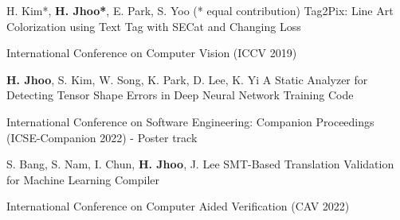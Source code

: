 

\begin{cventries}

  \cvpub
  {H. Kim*, \textbf{H. Jhoo*}, E. Park, S. Yoo (* equal contribution)} %
  {Tag2Pix: Line Art Colorization using Text Tag with SECat and Changing Loss} %
  {} %
  {} %
  {
    \begin{cvitems} %
      \item International Conference on Computer Vision (ICCV 2019)
    \end{cvitems}
  }

  \cvpub
  {\textbf{H. Jhoo}, S. Kim, W. Song, K. Park, D. Lee, K. Yi} %
  {A Static Analyzer for Detecting Tensor Shape Errors in Deep Neural Network Training Code} %
  {} %
  {} %
  {
    \begin{cvitems} %
      \item International Conference on Software Engineering: Companion Proceedings (ICSE-Companion 2022) - Poster track
    \end{cvitems}
  }

  \cvpub
  {S. Bang, S. Nam, I. Chun, \textbf{H. Jhoo}, J. Lee} %
  {SMT-Based Translation Validation for Machine Learning Compiler} %
  {} %
  {} %
  {
    \begin{cvitems} %
      \item International Conference on Computer Aided Verification (CAV 2022)
    \end{cvitems}
  }

\end{cventries}
